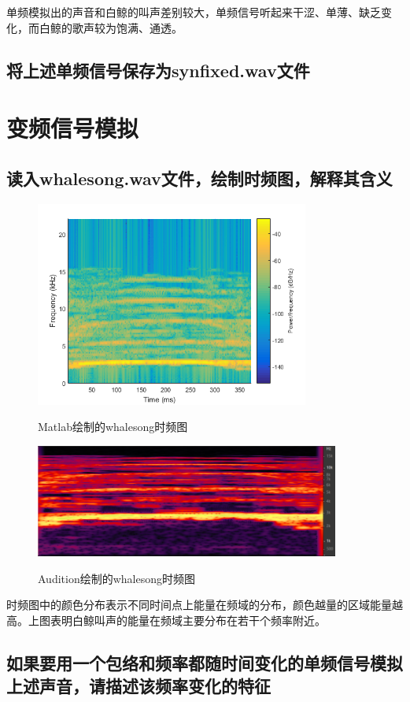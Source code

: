 \documentclass{article}
\begin{document}
            单频模拟出的声音和白鲸的叫声差别较大，单频信号听起来干涩、单薄、缺乏变化，而白鲸的歌声较为饱满、通透。
            
        \subsection{将上述单频信号保存为synfixed.wav文件}
    
    \section{变频信号模拟}
        \subsection{读入whalesong.wav文件，绘制时频图，解释其含义}
            \begin{figure}[htb]
                \centering
                \includegraphics[width=9cm]{figure5.png}
                \label{fig:originft-1}\caption{Matlab绘制的whalesong时频图}
            \end{figure}
            
            \begin{figure}[!htb]
                \centering
                \includegraphics[width=10cm]{figure6.png}
                \label{fig:originft-2}\caption{Audition绘制的whalesong时频图}
            \end{figure}
            
            时频图中的颜色分布表示不同时间点上能量在频域的分布，颜色越量的区域能量越高。上图表明白鲸叫声的能量在频域主要分布在若干个频率附近。
            
        \subsection{如果要用一个包络和频率都随时间变化的单频信号模拟上述声音，请描述该频率变化的特征}
            
\end{document}
